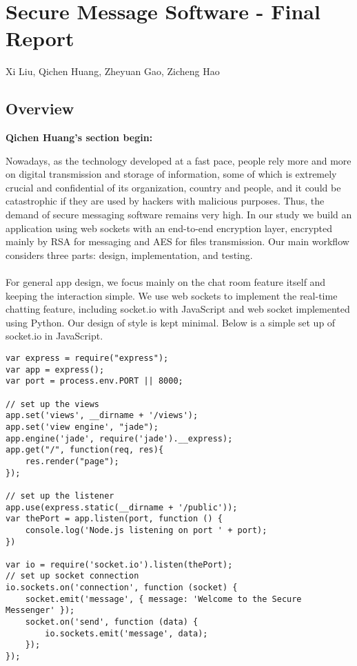 \documentclass[12pt, border = 4pt, multi]{article} %
\begin{document}
\section*{Secure Message Software - Final Report}
Xi Liu, Qichen Huang, Zheyuan Gao, Zicheng Hao\\
\subsection*{Overview}
\textbf{Qichen Huang's section begin:}
\begin{multicols}{2}
\noindent 
Nowadays, as the technology developed at a fast pace, people rely more and more on digital transmission and storage of information, some of which is extremely crucial and confidential of its organization, country and people, and it could be catastrophic if they are used by hackers with malicious purposes. Thus, the demand of secure messaging software remains very high. In our study we build an application using web sockets with an end-to-end encryption layer, encrypted mainly by RSA for messaging and AES for files transmission. Our main workflow considers three parts: design, implementation, and testing. \\
\\
For general app design, we focus mainly on the chat room feature itself and keeping the interaction simple. We use web sockets to implement the real-time chatting feature, including socket.io with JavaScript and web socket implemented using Python. Our design of style is kept minimal. Below is a simple set up of socket.io in JavaScript. \\
\begin{lstlisting}
var express = require("express");
var app = express();
var port = process.env.PORT || 8000;

// set up the views
app.set('views', __dirname + '/views');
app.set('view engine', "jade");
app.engine('jade', require('jade').__express);
app.get("/", function(req, res){
    res.render("page");
});

// set up the listener
app.use(express.static(__dirname + '/public'));
var thePort = app.listen(port, function () {
    console.log('Node.js listening on port ' + port);
})

var io = require('socket.io').listen(thePort);
// set up socket connection
io.sockets.on('connection', function (socket) {
    socket.emit('message', { message: 'Welcome to the Secure Messenger' });
    socket.on('send', function (data) {
        io.sockets.emit('message', data);
    });
});
\end{lstlisting}


\end{multicols}
\end{document}
